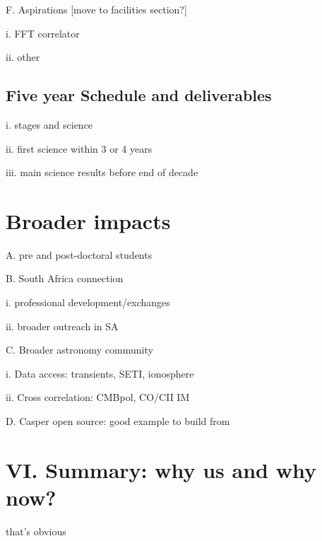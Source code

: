 \documentclass[preprint]{aastex}
\begin{document}
F. Aspirations [move to facilities section?]

i. FFT correlator

ii. other

\subsection{Five year Schedule and deliverables} %

i. stages and science

ii. first science within 3 or 4 years

iii. main science results before end of decade


\section{Broader impacts} %

A. pre and post-doctoral students

B. South Africa connection

i. professional development/exchanges

ii. broader outreach in SA

C. Broader astronomy community

i. Data access: transients, SETI, ionosphere

ii. Cross correlation: CMBpol, CO/CII IM

D. Casper open source: good example to build from


\section{VI. Summary: why us and why now?} %

that's obvious


\clearpage
\setcounter{page}{1}
\thispagestyle{empty}
%
%


\end{document}
